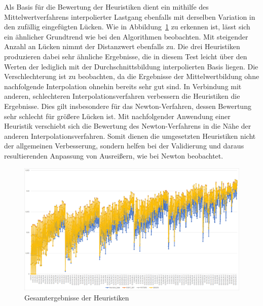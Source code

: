 Als Basis für die Bewertung der Heuristiken dient ein mithilfe des Mittelwertverfahrens interpolierter Lastgang ebenfalls mit derselben Variation in den zufällig eingefügten Lücken. Wie in Abbildung~\ref{fig:evaluation_heuristics} zu erkennen ist, lässt sich ein ähnlicher Grundtrend wie bei den Algorithmen beobachten. Mit steigender Anzahl an Lücken nimmt der Distanzwert ebenfalls zu. Die drei Heuristiken produzieren dabei sehr ähnliche Ergebnisse, die in diesem Test leicht über den Werten der lediglich mit der Durchschnittsbildung interpolierten Basis liegen.
Die Verschlechterung ist zu beobachten, da die Ergebnisse der Mittelwertbildung ohne nachfolgende Interpolation ohnehin bereits sehr gut sind. In Verbindung mit anderen, schlechteren Interpolationsverfahren verbessern die Heuristiken die Ergebnisse. Dies gilt insbesondere für das Newton-Verfahren, dessen Bewertung sehr schlecht für größere Lücken ist. Mit nachfolgender Anwendung einer Heuristik verschiebt sich die Bewertung des Newton-Verfahrens in die Nähe der anderen Interpolationsverfahren.
Somit dienen die umgesetzten Heuristiken nicht der allgemeinen Verbesserung, sondern helfen bei der Validierung und daraus resultierenden Anpassung von Ausreißern, wie bei Newton beobachtet.

\begin{figure}[!t]
	\begin{center}
		\includegraphics[width=0.9\columnwidth]{pics/evaluation-heuristics}
	\end{center}
	\caption{\label{fig:evaluation_heuristics}Gesamtergebnisse der Heuristiken}
\end{figure}